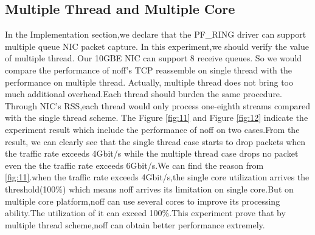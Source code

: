 \documentclass[conference]{IEEEtran}
\begin{document}
\subsection{Multiple Thread and Multiple Core}
In the Implementation section,we declare that the PF\_RING driver can support multiple queue NIC packet capture. In this experiment,we should verify the value of multiple thread.
\newline\indent Our 10GBE NIC can support 8 receive queues. So we would compare the performance of noff's TCP reassemble on single thread with the performance on multiple thread. Actually, multiple thread does not bring too much additional overhead.Each thread should burden the same procedure. Through NIC's RSS,each thread would only process one-eighth streams compared with the single thread scheme.
\newline\indent The Figure \ref{fig:11} and Figure \ref{fig:12} indicate the experiment result which include the performance of noff on two cases.From the result, we can clearly see that the single thread case starts to drop packets when the traffic rate exceeds 4Gbit/s while the multiple thread case drops no packet even the the traffic rate exceeds 6Gbit/s.We can find the reason from \ref{fig:11}.when the traffic rate exceeds 4Gbit/s,the single core utilization arrives the threshold(100\%) which means noff arrives its limitation on single core.But on multiple core platform,noff can use several cores to improve its processing ability.The utilization of it can exceed 100\%.This experiment prove that by multiple thread scheme,noff can obtain better performance extremely.
\end{document}

